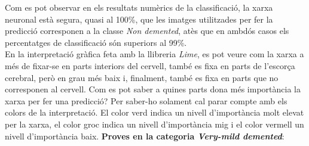 \documentclass[a4paper,12pt]{report}
\begin{document}
Com es pot observar en els resultats numèrics de la classificació, la xarxa neuronal està segura, quasi al 100\%, que les imatges utilitzades per fer la predicció corresponen a la classe \textit{Non demented}, atès que en ambdós casos els percentatges de classificació són superiors al 99\%.\\
En la interpretació gràfica feta amb la llibreria \textit{Lime}, es pot veure com la xarxa a més de fixar-se en parts interiors del cervell, també es fixa en parts de l'escorça cerebral, però en grau més baix i, finalment, també es fixa en parts que no corresponen al cervell. Com es pot saber a quines parts dona més importància la xarxa per fer una predicció? Per saber-ho solament cal parar compte amb els colors de la interpretació. El color verd indica un nivell d'importància molt elevat per la xarxa, el color groc indica un nivell d'importància mig i el color vermell un nivell d'importància baix.
\newpage
\textbf{Proves en la categoria \textit{Very-mild demented}}:
\end{document}
